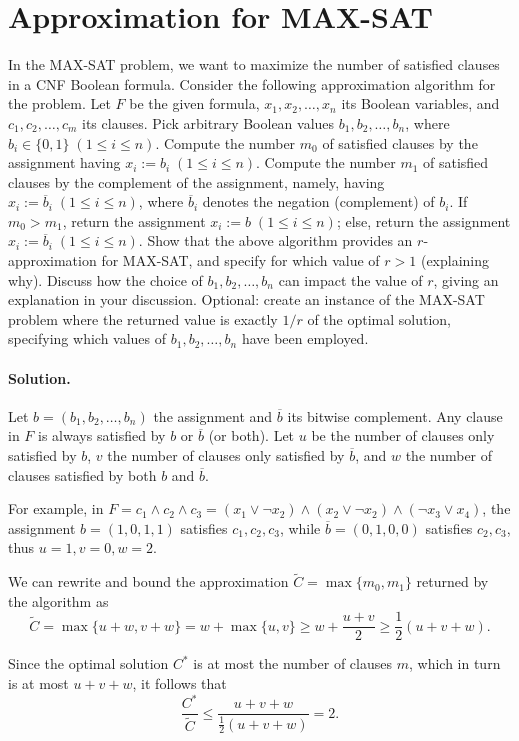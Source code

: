 \section{Approximation for MAX-SAT}

In the MAX-SAT problem, we want to maximize the number of satisfied clauses in a CNF Boolean formula. Consider the following approximation algorithm for the problem. Let $F$ be the given formula, $x_1, x_2, \dots, x_n$ its Boolean variables, and $c_1, c_2, \dots, c_m$ its clauses. Pick arbitrary Boolean values $b_1, b_2, \dots, b_n$, where $b_i \in  \{0,1\} \; (1 \leq i \leq n)$. Compute the number $m_0$ of satisfied clauses by the assignment having $x_i := b_i \; (1 \leq i \leq n)$. Compute the number $m_1$ of satisfied clauses by the complement of the assignment, namely, having $x_i := \overline{b}_i \; (1 \leq i \leq n)$, where $\overline{b}_i$ denotes the negation (complement) of $b_i$. If $m_0 > m_1$, return the assignment $x_i := b \; (1 \leq i \leq n)$; else, return the assignment $x_i := \overline{b}_i \; (1 \leq i \leq n)$. Show that the above algorithm provides an $r$-approximation for MAX-SAT, and specify for which value of $r > 1$ (explaining why). Discuss how the choice of $b_1, b_2, \dots, b_n$ can impact the value of $r$, giving an explanation in your discussion. Optional: create an instance of the MAX-SAT problem where the returned value is exactly $1/r$ of the optimal solution, specifying which values of $b_1, b_2, \dots, b_n$ have been employed.

\vspace{0.5cm}
\paragraph{Solution.} Let $b=(b_1, b_2, \dots, b_n)$ the assignment and $\overline{b}$ its bitwise complement. Any clause in $F$ is always satisfied by $b$ or $\overline{b}$ (or both). Let $u$ be the number of clauses only satisfied by $b$, $v$ the number of clauses only satisfied by $\overline{b}$, and $w$ the number of clauses satisfied by both $b$ and $\overline{b}$.

For example, in $F=c_1 \wedge c_2 \wedge c_3 = (x_1 \vee \neg x_2) \wedge (x_2 \vee \neg x_2) \wedge (\neg x_3 \vee x_4)$, the assignment $b = (1, 0, 1, 1)$ satisfies $c_1, c_2, c_3$, while $\overline{b} = (0, 1, 0, 0)$ satisfies $c_2, c_3$, thus $u=1, v=0, w=2$.

We can rewrite and bound the approximation $\widetilde{C} = \max\{m_0, m_1\}$ returned by the algorithm as $$\widetilde{C} = \max\{u+w, v+w\}=w+\max\{u, v\}\geq w + \frac{u+v}{2} \geq \frac{1}{2} (u+v+w).$$

Since the optimal solution $C^*$ is at most the number of clauses $m$, which in turn is at most $u+v+w$, it follows that
$$\frac{C^*}{\widetilde{C}} \leq \frac{u+v+w}{\frac{1}{2}(u+v+w)} = 2.$$